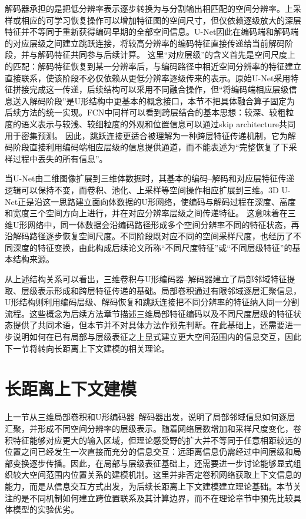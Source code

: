 解码器承担的是把低分辨率表示逐步转换为与分割输出相匹配的空间分辨率。上采样或相应的可学习恢复操作可以增加特征图的空间尺寸，但仅依赖逐级放大的深层特征并不等同于重新获得编码早期的全部空间信息。U-Net因此在编码端和解码端的对应层级之间建立跳跃连接，将较高分辨率的编码特征直接传递给当前解码阶段，并与解码特征共同参与后续计算。\cite{ronneberger2015unet} 这里“对应层级”的含义首先是空间尺度上的匹配：解码特征恢复到某一分辨率后，与编码路径中相近空间分辨率的特征建立直接联系，使该阶段不必仅依赖从更低分辨率逐级传来的表示。原始U-Net采用特征拼接完成这一传递，后续结构可以采用不同融合操作，但“将编码端相应层级信息送入解码阶段”是U形结构中更基本的概念接口，本节不把具体融合算子固定为后续方法的统一实现。FCN中同样可以看到跨层结合的基本思想：较深、较粗粒度的语义表示与较浅、较细粒度的外观和位置信息可以通过skip architecture共同用于密集预测。\cite{long2015fcn} 因此，跳跃连接更适合被理解为一种跨层特征传递机制，它为解码阶段直接利用编码端相应层级的信息提供通道，而不能表述为“完整恢复了下采样过程中丢失的所有信息”。

当U-Net由二维图像扩展到三维体数据时，其基本的编码--解码和对应层特征传递逻辑可以保持不变，而卷积、池化、上采样等空间操作相应扩展到三维。3D U-Net正是沿这一思路建立面向体数据的U形网络，使编码与解码过程在深度、高度和宽度三个空间方向上进行，并在对应分辨率层级之间传递特征。\cite{cicek2016threeDunet} 这意味着在三维U形网络中，同一体数据会沿编码路径形成多个空间分辨率不同的特征状态，再沿解码路径逐步恢复空间尺度。不同阶段既对应不同的空间采样尺度，也经历了不同深度的特征变换，由此构成后续论文所称“不同尺度特征”或“不同层级特征”的基本结构来源。

从上述结构关系可以看出，三维卷积与U形编码器--解码器建立了局部邻域特征提取、层级表示形成和跨层特征传递的基础。局部卷积通过有限邻域逐层汇聚信息，U形结构则利用编码层级、解码恢复和跳跃连接把不同分辨率的特征纳入同一分割流程。这些概念为后续方法章节描述三维局部特征编码以及不同尺度层级的特征状态提供了共同术语，但本节并不对具体方法作预先判断。在此基础上，还需要进一步说明如何在已有局部与层级表征之上显式建立更大空间范围内的信息交互，因此下一节将转向长距离上下文建模的相关理论。

\section{长距离上下文建模}

上一节从三维局部卷积和U形编码器--解码器出发，说明了局部邻域信息如何逐层汇聚，并形成不同空间分辨率的层级表示。随着网络层数增加和采样尺度变化，卷积特征能够对应更大的输入区域，但理论感受野的扩大并不等同于任意相距较远的位置之间已经发生一次直接而充分的信息交互：远距离信息仍需经过中间层级和局部变换逐步传播。因此，在局部与层级表征基础上，还需要进一步讨论能够显式组织较大空间范围内位置关系的建模机制。这里并非否定卷积网络获取上下文信息的能力，而是从信息交互方式出发，为后续长距离上下文建模建立理论基础。本节关注的是不同机制如何建立跨位置联系及其计算边界，而不在理论章节中预先比较具体模型的实验优劣。

